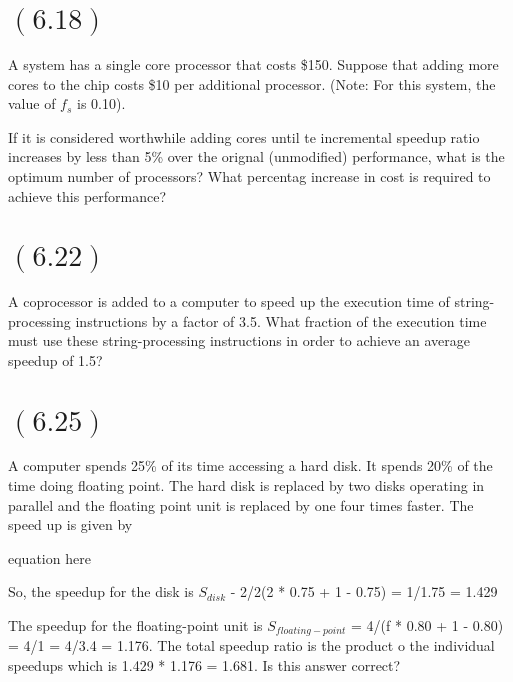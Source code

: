 \documentclass[letterpaper,12pt,titlepage]{article}
\begin{document}
\begin{mdframed}[style=MyFrame]
\end{mdframed}

\section*{$(6.18)$} A system has a single core processor that costs \$150. Suppose that adding more cores to the chip costs \$10 per additional processor. (Note: For this system, the value of $f_s$ is 0.10).

If it is considered worthwhile adding cores until te incremental speedup ratio increases by less than 5\% over the orignal (unmodified) performance, what is the optimum number of processors? What percentag increase in cost is required to achieve this performance?

\begin{mdframed}[style=MyFrame]
\end{mdframed}

\section*{$(6.22)$} A coprocessor is added to a computer to speed up the execution time of string-processing instructions by a factor of 3.5. What fraction of the execution time must use these string-processing instructions in order to achieve an average speedup of 1.5?

\begin{mdframed}[style=MyFrame]
\end{mdframed}

\section*{$(6.25)$} A computer spends 25\% of its time accessing a hard disk. It spends 20\% of the time doing floating point. The hard disk is replaced by two disks operating in parallel and the floating point unit is replaced by one four times faster. The speed up is given by

equation here

So, the speedup for the disk is $S_{disk}$ - 2/2(2 * 0.75 + 1 - 0.75) = 1/1.75 = 1.429

The speedup for the floating-point unit is $S_{floating-point}$ = 4/(f * 0.80 + 1 - 0.80) = 4/1 = 4/3.4 = 1.176. The total speedup ratio is the product o the individual speedups which is 1.429 * 1.176 = 1.681. Is this answer correct?
\end{document}
